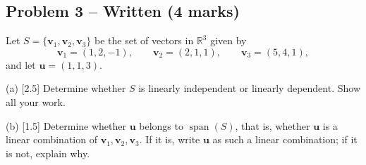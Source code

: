 \documentclass[11pt,a4paper]{article}
\begin{document}
\subsection*{Problem 3 -- Written (4 marks)}
Let $S=\{\mathbf{v}_1,\mathbf{v}_2,\mathbf{v}_3\}$ be the set of vectors in $\mathbb{R}^3$ given by\[\mathbf{v}_1=(1,2,-1),\qquad \mathbf{v}_2=(2,1,1),\qquad \mathbf{v}_3=(5,4,1),\]and let $\mathbf{u}=(1,1,3)$.\par (a) [2.5] Determine whether $S$ is linearly independent or linearly dependent. Show all your work.\par (b) [1.5] Determine whether $\mathbf{u}$ belongs to $\operatorname{span}(S)$, that is, whether $\mathbf{u}$ is a linear combination of $\mathbf{v}_1,\mathbf{v}_2,\mathbf{v}_3$. If it is, write $\mathbf{u}$ as such a linear combination; if it is not, explain why.\par
\end{document}
